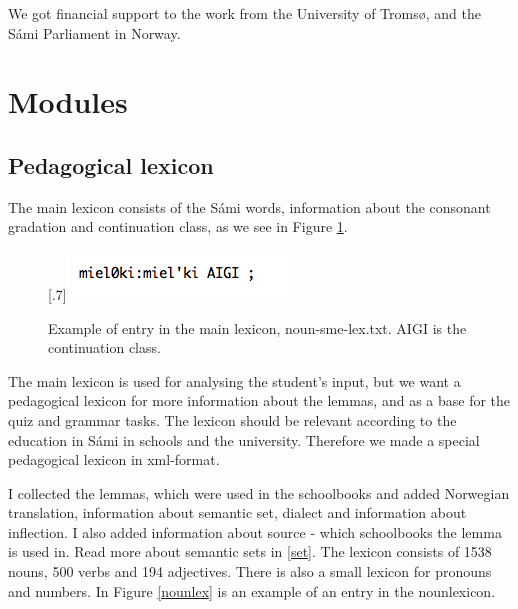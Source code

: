 \documentclass[a4paper,12pt]{article}
\begin{document}
We got financial support to the work from the University of Tromsø, and the Sámi Parliament in Norway.


\section{Modules}

\subsection{Pedagogical lexicon}

The main lexicon consists of the Sámi words, information about the consonant gradation and continuation class, as we see in Figure \ref{nounsmelex}.\\


\begin{figure}[htbp]
\begin{center}
\scalebox{.7}[.7]{\includegraphics{img/noun-sme-lex.png}}\\
\caption{Example of entry in the main lexicon, noun-sme-lex.txt. AIGI is the continuation class.}
\label{nounsmelex}
\end{center}
\end{figure}

The main lexicon is used for analysing the student’s input, but we want a pedagogical lexicon for more information about the lemmas, and as a base for the quiz and grammar tasks. The lexicon should be relevant according to the education in Sámi in schools and the university. Therefore we made a special pedagogical lexicon in xml-format. 

I collected the lemmas, which were used in the schoolbooks and added Norwegian translation, information about semantic set, dialect and information about inflection. I also added information about source - which schoolbooks the lemma is used in. Read more about semantic sets in \ref{set}. The lexicon consists of 1538 nouns, 500 verbs and 194 adjectives. There is also a small lexicon for pronouns and numbers. In Figure \ref{nounlex} is an example of an entry in the nounlexicon. \\
\end{document}
